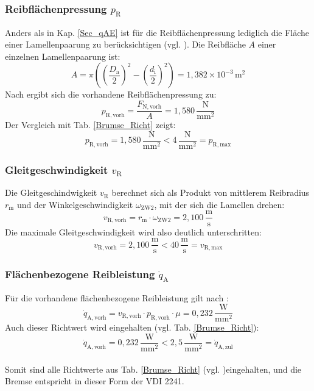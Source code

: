 \subsubsection{Reibflächenpressung $p_\mathrm{R}$}
Anders als in Kap. \ref{Sec_qAE} ist für die Reibflächenpressung lediglich die Fläche einer Lamellenpaarung zu berücksichtigen (vgl. \cite[S. 46]{RM}). Die Reibfläche $A$ einer einzelnen Lamellenpaarung ist:
\begin{equation}
    A = \pi \left( \left(\frac{D_\mathrm{a}}{2}\right)^2 - \left(\frac{d_\mathrm{i}}{2}\right)^2 \right) = 1,382\times10^{-3}\,\mathrm{m^2}
\end{equation}
Nach \cite[S. 46, Gl. 3.10]{RM} ergibt sich die vorhandene Reibflächenpressung zu:
\begin{equation}
    p_\mathrm{R,vorh} = \frac{F_\mathrm{N,vorh}}{A} = 1,580\,\mathrm{\frac{N}{mm^2}}
\end{equation}
Der Vergleich mit Tab. \ref{Brumse_Richt} zeigt:
\begin{equation}
    p_\mathrm{R,vorh} = 1,580\,\mathrm{\frac{N}{mm^2}} < 4\,\mathrm{\frac{N}{mm^2}} = p_\mathrm{R,max}
\end{equation}


\subsubsection{Gleitgeschwindigkeit $v_\mathrm{R}$}
Die Gleitgeschindwigkeit $v_\mathrm{R}$ berechnet sich als Produkt von mittlerem Reibradius $r_\mathrm{m}$ und der Winkelgeschwindigkeit $\omega_\mathrm{ZW2}$, mit der sich die Lamellen drehen:
\begin{equation}
    v_\mathrm{R,vorh} = r_\mathrm{m} \cdot \omega_\mathrm{ZW2} = 2,100\,\mathrm{\frac{m}{s}}
\end{equation}
Die maximale Gleitgeschwindigkeit wird also deutlich unterschritten:
\begin{equation}
    v_\mathrm{R,vorh} = 2,100\,\mathrm{\frac{m}{s}} < 40\,\mathrm{\frac{m}{s}} = v_\mathrm{R,max}
\end{equation}

\subsubsection{Flächenbezogene Reibleistung $\dot{q}_\mathrm{A}$}
Für die vorhandene flächenbezogene Reibleistung gilt nach \cite[S. 15, Gl. 12]{VDI2241-1}:
\begin{equation}
    \dot{q}_\mathrm{A,vorh} = v_\mathrm{R,vorh} \cdot p_\mathrm{R,vorh} \cdot \mu = 0,232\,\mathrm{\frac{W}{mm^2}}
\end{equation}
Auch dieser Richtwert wird eingehalten (vgl. Tab. \ref{Brumse_Richt}): 
\begin{equation}
    \dot{q}_\mathrm{A,vorh} =  0,232\,\mathrm{\frac{W}{mm^2}} < 2,5\,\mathrm{\frac{W}{mm^2}} = \dot{q}_\mathrm{A,zul}
\end{equation}\\
\newline
\noindent
Somit sind alle Richtwerte aus Tab. \ref{Brumse_Richt} (vgl. \cite[S. 5, Tab. 2]{VDI2241-2})eingehalten, und die Bremse entspricht in dieser Form der VDI 2241. 


